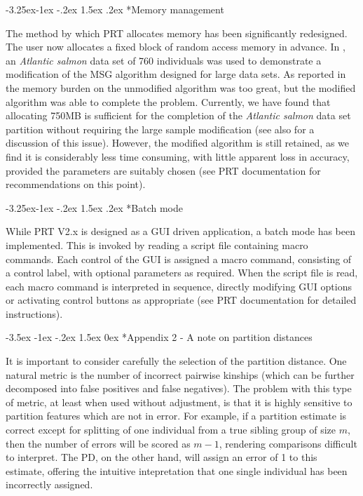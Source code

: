 \documentclass[twoside,10pt,twocolumn]{article}
\makeatletter
\renewcommand\section{\@startsection {section}{1}{\z@}%
                                   {-3.5ex \@plus -1ex \@minus -.2ex}%
                                   {1.5ex \@plus 0ex}%
                                   {\normalfont\normalsize\bfseries}}
\renewcommand\subsection{\@startsection{subsection}{2}{\z@}%
                                     {-3.25ex\@plus -1ex \@minus -.2ex}%
                                     {1.5ex \@plus .2ex}%
                                     {\normalfont\normalsize\itshape}}
\makeatother
\begin{document}
\subsection*{Memory management}

The method by which PRT allocates memory has been significantly redesigned. The user now allocates a fixed 
block of random access memory in advance. In \citet{almudevar99}, an \emph{Atlantic salmon} data set of 760 
individuals \citep{oreilly98, herbinger99} was used to demonstrate a modification of the MSG algorithm 
designed for large data sets. As reported in \citet{almudevar99} the memory burden on the unmodified 
algorithm was too great, but the modified algorithm was able to complete the problem.  Currently, we have 
found that allocating 750MB is sufficient for the completion of the \emph{Atlantic salmon} data set 
partition without requiring the large sample modification (see also \citealt{alm&and11} for a discussion of 
this issue).  However, the modified algorithm is still retained, as we find it is considerably less time 
consuming, with little apparent loss in accuracy, provided the parameters are suitably chosen (see PRT 
documentation for recommendations on this point).   
  
\subsection*{Batch mode}

While PRT V2.x is designed as a GUI driven application, a batch mode has been implemented. This is invoked 
by reading a script file containing macro commands. Each control of the GUI is assigned a macro command, 
consisting of a control label, with optional parameters as required. When the script file is read, each 
macro command is interpreted in sequence, directly modifying GUI options or activating control buttons as 
appropriate (see PRT documentation for detailed instructions).   

\section*{Appendix 2 - A note on partition distances} 

It is important to consider carefully the selection of the partition distance.  One natural metric is the 
number of incorrect pairwise kinships (which can be further decomposed into false positives and false 
negatives). The problem with this type of metric, at least when used without adjustment, is that it is 
highly sensitive to partition features which are not in error. For example, if a partition estimate is 
correct except for splitting of one individual from a true sibling group of size $m$, then the number of 
errors will be scored as $m-1$, rendering comparisons difficult to interpret. The PD, on the other hand, 
will assign an error of 1 to this estimate, offering the intuitive intepretation that one single individual 
has been incorrectly assigned.      
\end{document}
